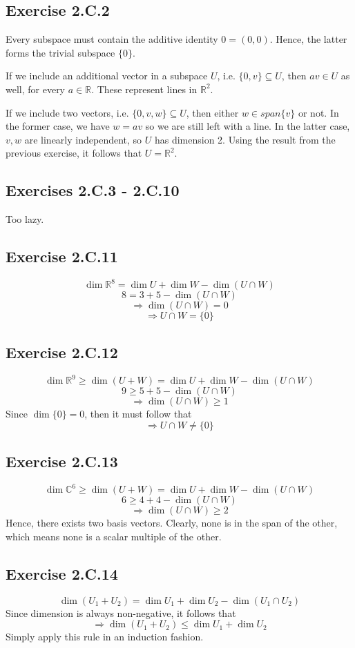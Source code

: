 \documentclass{book}
\begin{document}
\subsection*{Exercise 2.C.2}
Every subspace must contain the additive identity $0 = (0, 0)$. Hence, the latter forms the trivial subspace $\{ 0 \}$.

If we include an additional vector in a subspace $U$, i.e. $\{ 0, v \} \subseteq U$, then $av \in U$ as well, for every $a \in \mathbb{R}$. These represent lines in $\mathbb{R}^2$.

If we include two vectors, i.e. $\{ 0, v, w \} \subseteq U$, then either $w \in span\{ v \}$ or not. In the former case, we have $w = av$ so we are still left with a line. In the latter case, $v, w$ are linearly independent, so $U$ has dimension 2. Using the result from the previous exercise, it follows that $U = \mathbb{R}^2$.

\subsection*{Exercises 2.C.3 - 2.C.10}
Too lazy.

\subsection*{Exercise 2.C.11}
$$\dim \mathbb{R}^8 = \dim U + \dim W - \dim (U \cap W)$$
$$8 = 3 + 5 - \dim (U \cap W)$$
$$\Rightarrow \dim (U \cap W) = 0$$
$$\Rightarrow U \cap W = \{ 0 \}$$

\subsection*{Exercise 2.C.12}
$$\dim \mathbb{R}^9 \geq \dim (U + W) = \dim U + \dim W - \dim (U \cap W)$$
$$9 \geq 5 + 5 - \dim (U \cap W)$$
$$\Rightarrow \dim (U \cap W) \geq 1$$
Since $\dim \{ 0 \} = 0$, then it must follow that
$$\Rightarrow U \cap W \neq \{ 0 \}$$

\subsection*{Exercise 2.C.13}
$$\dim \mathbb{C}^6 \geq \dim (U + W) = \dim U + \dim W - \dim (U \cap W)$$
$$6 \geq 4 + 4 - \dim (U \cap W)$$
$$\Rightarrow \dim (U \cap W) \geq 2$$
Hence, there exists two basis vectors. Clearly, none is in the span of the other, which means none is a scalar multiple of the other.

\subsection*{Exercise 2.C.14}
$$\dim (U_1 + U_2) = \dim U_1 + \dim U_2 - \dim (U_1 \cap U_2)$$
Since dimension is always non-negative, it follows that
$$\Rightarrow \dim (U_1 + U_2) \leq \dim U_1 + \dim U_2$$
Simply apply this rule in an induction fashion.
\end{document}
